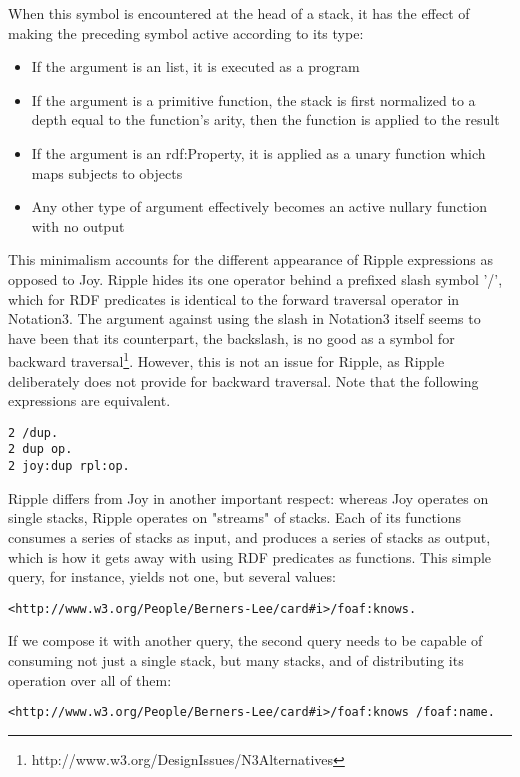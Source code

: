 \documentclass[runningheads]{llncs}
\begin{document}
When this symbol is encountered at the head of a stack, it has the effect of making the preceding symbol active according to its type:
\begin{itemize}
\item If the argument is an list, it is executed as a program
\item If the argument is a primitive function, the stack is first normalized to a depth equal to the function's arity, then the function is applied to the result
\item If the argument is an rdf:Property, it is applied as a unary function which maps subjects to objects
\item Any other type of argument effectively becomes an active nullary function with no output
\end{itemize}

This minimalism accounts for the different appearance of Ripple expressions as opposed to Joy.  Ripple hides its one operator behind a prefixed slash symbol '/', which for RDF predicates is identical to the forward traversal operator in Notation3.  The argument against using the slash in Notation3 itself seems to have been that its counterpart, the backslash, is no good as a symbol for backward traversal\footnote{http://www.w3.org/DesignIssues/N3Alternatives}.  However, this is not an issue for Ripple, as Ripple deliberately does not provide for backward traversal.  Note that the following expressions are equivalent.

\begin{verbatim}
2 /dup.
2 dup op.
2 joy:dup rpl:op.
\end{verbatim}

Ripple differs from Joy in another important respect: whereas Joy operates on single stacks, Ripple operates on "streams" of stacks.  Each of its functions consumes a series of stacks as input, and produces a series of stacks as output, which is how it gets away with using RDF predicates as functions.  This simple query, for instance, yields not one, but several values:

\begin{verbatim}
<http://www.w3.org/People/Berners-Lee/card#i>/foaf:knows.
\end{verbatim}

If we compose it with another query, the second query needs to be capable of consuming not just a single stack, but many stacks, and of distributing its operation over all of them:

\begin{verbatim}
<http://www.w3.org/People/Berners-Lee/card#i>/foaf:knows /foaf:name.
\end{verbatim}
\end{document}
